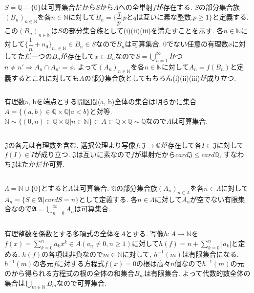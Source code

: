 \documentclass{jsarticle}
\begin{document}
\subsection{} %
$S = \mathbb{Q} - \{0\}$は可算集合だから$S$から$A$への全単射$f$が存在する. $S$の部分集合族$(B_n)_{n \in \mathbb{N}}$を各$n \in \mathbb{N}$に対して$B_n = \{\dfrac{q}{p} | pとqは互いに素な整数. p \geq 1\}$と定義する. この$(B_n)_{n \in \mathbb{N}}$は$S$の部分集合族として(i)(ii)(iii)を満たすことを示す. 各$n \in \mathbb{N}$に対して$\{\dfrac{1}{n} + n_0\}_{n_0 \in \mathbb{N}} \in B_n \in S$なので$B_n$は可算集合. 0でない任意の有理数$x$に対してただ一つの$B_n$が存在して$x \in B_n$なので$S = \bigcup_{n = 1}^{\infty}$かつ$n \neq n' \Rightarrow A_n \cap A_{n'} = \phi$. よって$(A_n)_{n \in \mathbb{N}}$を各$n \in \mathbb{N}$に対して$A_n = f(B_n)$と定義するとこれに対しても$A$の部分集合族としてもちろん(i)(ii)(iii)が成り立つ.

\subsection{} %
有理数a, bを端点とする開区間(a, b)全体の集合は明らかに集合$A = \{(a, b) \in \mathbb{Q} \times \mathbb{Q}| a < b\}$と対等. $\mathbb{N} \sim \{(0, n) \in \mathbb{Q} \times \mathbb{Q}| n \in \mathbb{N}\} \subset A \subset \mathbb{Q} \times \mathbb{Q} \sim \mathbb{Q}$なので$A$は可算集合.

\subsection{} %
$\mathfrak{J}$の各元は有理数を含む. 選択公理より写像$f: \mathfrak{J} \rightarrow \mathbb{Q}$が存在して各$I \in \mathfrak{J}$に対して$f(I) \in I$が成り立つ. $\mathfrak{J}$は互いに素なので$f$が単射だから$card \mathfrak{J} \leq card \mathbb{Q}$, すなわち$\mathfrak{J}$はたかだか可算.

\subsection{} %
$\Lambda = \mathbb{N} \cup \{0\}$とすると$\Lambda$は可算集合. $\mathfrak{A}$の部分集合族$(A_n)_{n \in \Lambda}$を各$n \in \Lambda$に対して$A_n = \{S \in \mathfrak{A}| card S = n\}$として定義する. 各$n \in\Lambda$に対して$A_n$が空でない有限集合なので$\mathfrak{A} = \bigcup_{n = 0}^{\infty}A_n$は可算集合.

\subsection{} %
有理整数を係数とする多項式の全体を$A$とする. 写像$h: A \rightarrow \mathbb{N}$を$f(x) = \sum_{k = 0}^n a_k x^k \in A$$(a_n \neq 0, n \geq 1)$に対して$h(f) = n + \sum_{k = 0}^n |a_k|$と定める. $h(f)$の各項は非負なので$m \in \mathbb{N}$に対して, $h^{-1}(m)$は有限集合になる. $h^{-1}(m)$の各元$f$に対する方程式$f(x) = 0$の根は高々$n$個なので$h^{-1}(m)$の元のから得られる方程式の根の全体の和集合$B_m$は有限集合. よって代数的数全体の集合は$\bigcup_{m \in \mathbb{N}}B_m$なので可算集合.
\end{document}
